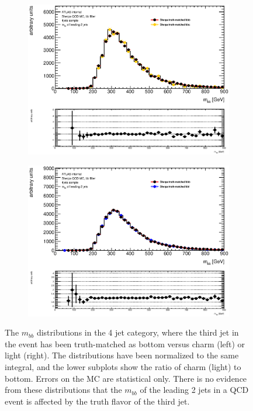 \begin{figure}[phtb!]
  \begin{center}
  \begin{subfigure}[$BBB$ vs $BBC$, 4 jet category]{0.45\textwidth}\includegraphics[width=\textwidth]{MonteCarlo/figures/mbb_bbB_4jets_bbB_bbC.eps}\end{subfigure}
  \begin{subfigure}[$BBB$ vs $BBL$, 4 jet category]{0.45\textwidth}\includegraphics[width=\textwidth]{MonteCarlo/figures/mbb_bbB_4jets_bbB_bbL.eps}\end{subfigure}
  \caption{The $m_{bb}$ distributions in the 4 jet category, where the third jet in the event has been 
  truth-matched as bottom versus charm (left) or light (right).  The distributions have been normalized to 
  the same integral, and the lower subplots show the ratio of charm (light) to bottom.  Errors on the MC
  are statistical only.  There is no evidence from these distributions that the $m_{bb}$ of the leading
  2 jets in a QCD event is affected by the truth flavor of the third jet. 
  \label{fig:mbb_bb_qcd_mc}}
    \end{center}
\end{figure}






